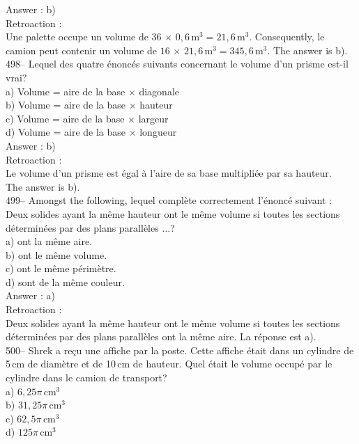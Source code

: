 ﻿\documentclass[letterpaper, 12pt]{article}
\begin{document}
Answer : b)\\

Retroaction :\\
Une palette occupe un volume de $36\,\times\,0,6$\,m$^{3}=21,6$\,m$^{3}$.
Consequently, le camion peut contenir un volume de
$16\,\times\,21,6$\,m$^{3}=345,6$\,m$^{3}$.  The answer is b).\\

498-- Lequel des quatre \'enonc\'es suivants concernant le volume d'un
prisme est-il vrai?\\
a) Volume = aire de la base $\times$ diagonale\\
b) Volume = aire de la base $\times$ hauteur\\
c) Volume = aire de la base $\times$ largeur\\
d) Volume = aire de la base $\times$ longueur\\

Answer : b)\\

Retroaction : \\
Le volume d'un prisme est \'egal \`a l'aire de sa base multipli\'ee par sa
hauteur.\\
The answer is b).\\

499-- Amongst the following, lequel compl\`ete
correctement l'\'enonc\'e suivant : \og Deux solides ayant la m\^eme
hauteur ont le m\^eme volume si toutes les sections d\'etermin\'ees
par des plans parall\`eles $\ldots$\fg ?\\
a) ont la m\^eme aire.\\
b) ont le m\^eme volume.\\
c) ont le m\^eme p\'erim\`etre.\\
d) sont de la m\^eme couleur.\\

Answer : a)\\

Retroaction : \\
Deux solides ayant la m\^eme hauteur ont le m\^eme volume si toutes les
sections d\'etermin\'ees par des plans parall\`eles ont la m\^eme aire.  La
r\'eponse est a).\\

500-- Shrek a re\c cu une affiche par la poste.  Cette affiche \'etait dans
un cylindre de 5\,cm de diam\`etre et de 10\,cm de hauteur.  Quel \'etait le
volume occup\'e par le cylindre dans le camion de transport?\\
a) $6,25\pi$\,cm$^{3}$\\
b) $31,25\pi$\,cm$^{3}$\\
c) $62,5\pi$\,cm$^{3}$\\
d) $125\pi$\,cm$^{3}$\\
\end{document}
